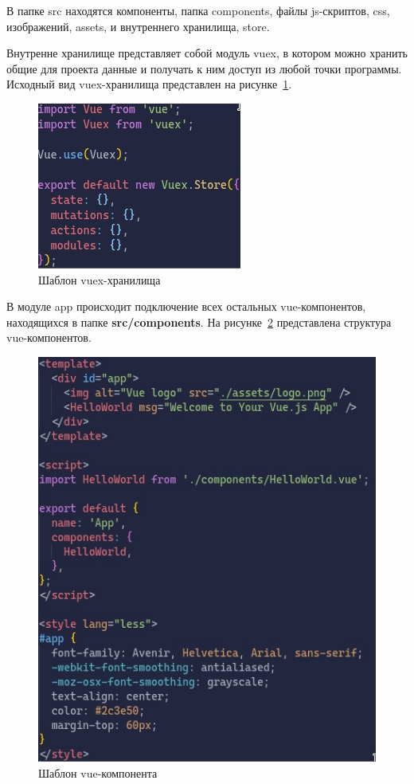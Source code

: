 В папке src находятся компоненты, папка components, файлы js-скриптов, css, изображений, assets, и внутреннего хранилища, store.

Внутренне хранилище представляет собой модуль vuex, в котором можно хранить общие для проекта данные и получать к ним доступ из любой точки программы. Исходный вид vuex-хранилища представлен на рисунке~\ref{img:vuexTemp}.

\begin{figure}[H]
  \centering
  \includegraphics{TexModules/pics/vuexTemp.jpg}
  \caption{Шаблон vuex-хранилища}
  \label{img:vuexTemp}
\end{figure}

В модуле app происходит подключение всех остальных vue-компонентов, находящихся в папке \textbf{src/components}. На рисунке~\ref{img:vueCompTemp} представлена структура vue-компонентов.

\begin{figure}[H]
  \centering
  \includegraphics[height=0.4\textheight]{TexModules/pics/vueCompTemp.jpg}
  \caption{Шаблон vue-компонента}
  \label{img:vueCompTemp}
\end{figure}

